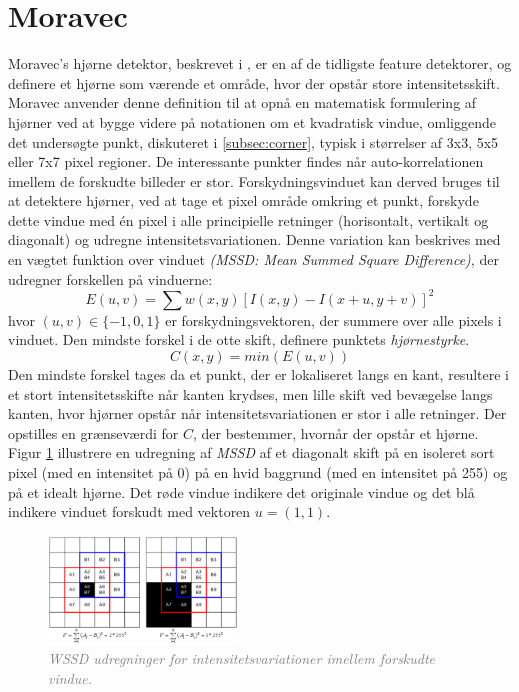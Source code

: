 \section{Moravec}\label{sec:moravec}
Moravec's hjørne detektor, beskrevet i \cite{moravec}, er en af de tidligste feature detektorer, og definere et hjørne som værende et område, hvor der opstår store intensitetsskift. Moravec anvender denne definition til at opnå en matematisk formulering af hjørner ved at bygge videre på notationen om et kvadratisk vindue, omliggende det undersøgte punkt, diskuteret i \ref{subsec:corner}, typisk i størrelser af 3x3, 5x5 eller 7x7 pixel regioner. De interessante punkter findes når auto-korrelationen imellem de forskudte billeder er stor. Forskydningsvinduet kan derved bruges til at detektere hjørner, ved at tage et pixel område omkring et punkt, forskyde dette vindue med én pixel i alle principielle retninger (horisontalt, vertikalt og diagonalt) og udregne intensitetsvariationen. Denne variation kan beskrives med en vægtet funktion over vinduet  \emph{(MSSD: Mean Summed Square Difference)}, der udregner forskellen på vinduerne:
\begin{equation}
E(u,v)= \sum w(x,y)[I(x,y)-I(x+u,y+v)]^2     
\end{equation}
hvor $(u,v)\in \lbrace -1,0,1 \rbrace$ er forskydningsvektoren, der summere over alle pixels i vinduet. Den mindste forskel i de otte skift, definere punktets \textit{hjørnestyrke}.
$$
C(x,y)=min(E(u,v))
$$
Den mindste forskel tages da et punkt, der er lokaliseret langs en kant, resultere i et stort intensitetsskifte når kanten krydses, men lille skift ved bevægelse langs kanten, hvor hjørner opstår når intensitetsvariationen er stor i alle retninger. Der opstilles en grænseværdi for $C$, der bestemmer, hvornår der opstår et hjørne. Figur \ref{fig:moravec} illustrere en udregning af \textit{MSSD} af et diagonalt skift på en isoleret sort pixel (med en intensitet på 0) på en hvid baggrund (med en intensitet på 255) og på et idealt hjørne. Det røde vindue indikere det originale vindue og det blå indikere  vinduet forskudt med vektoren $u = (1,1)$. 
\begin{figure}[H]
    \centering
    \includegraphics[width=0.45\textwidth]{fig/25.png}
     \vspace{-1em}
    \begin{center}    
       \caption{\textcolor{gray}{\footnotesize \textit{ WSSD udregninger for intensitetsvariationer imellem forskudte vindue. }}}
    \label{fig:moravec}
     \end{center}
     \vspace{-2.5em}
  \end{figure} \noindent

